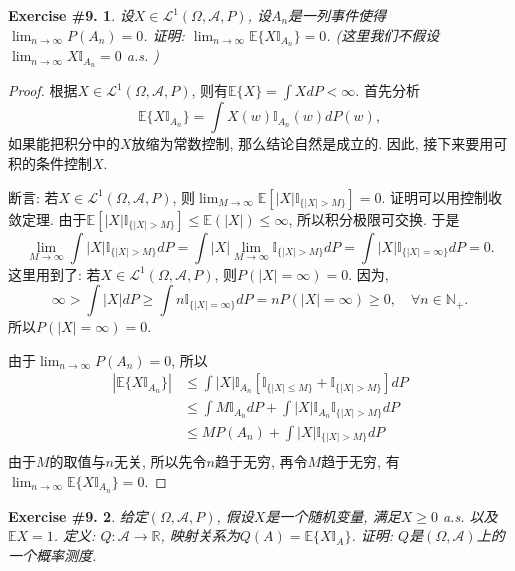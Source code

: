 \documentclass[UTF8, a4paper]{article}
\newtheorem{exercise}{Exercise \#9.}
\begin{document}
\begin{framed}
\begin{exercise}
设\(X \in \mathcal{L}^1(\Omega, \mathcal{A}, P)\), 设\(A_n\)是一列事件使得\(\lim_{n\to \infty}P(A_n) = 0\).
证明: \(\lim_{n\to\infty} \mathbb{E}\{X \mathbb{I}_{A_n}\} = 0\). (这里我们不假设$\lim _{n \rightarrow \infty} X \mathbb{I}_{A_n}=0$ a.s. )
\end{exercise}
\end{framed}
\begin{proof}
根据\(X \in \mathcal{L}^1(\Omega, \mathcal{A}, P)\), 
则有\(\mathbb{E}\{X\} = \int X dP < \infty\).
首先分析
$$
\mathbb{E}\{X \mathbb{I}_{A_n}\} = \int X(w) \mathbb{I}_{A_n}(w) dP(w) ,
$$
如果能把积分中的\(X\)放缩为常数控制, 那么结论自然是成立的.
因此, 接下来要用可积的条件控制\(X\).

断言: 若\(X \in \mathcal{L}^1(\Omega,\mathcal{A}, P)\), 则\(\lim_{M \to\infty}\mathbb{E}\left[|X|\mathbb{I}_{\{|X| > M\}}\right] = 0\).
证明可以用控制收敛定理.
由于\(\mathbb{E}\left[|X|\mathbb{I}_{\{|X| > M\}}\right] \leq \mathbb{E}\left(|X|\right) \leq \infty\), 所以积分极限可交换.
于是 
$$
\lim_{M\to\infty} \int |X| \mathbb{I}_{\{|X| > M\}} dP = \int |X| \lim_{M\to\infty}\mathbb{I}_{\{|X| > M\}} dP = \int |X| \mathbb{I}_{\{|X| = \infty\}} dP = 0.
$$
这里用到了: 若\(X \in \mathcal{L}^1(\Omega, \mathcal{A}, P)\), 则\(P(|X| = \infty) = 0\).
因为,
$$
\infty > \int |X| dP \geq \int n\mathbb{I}_{\{|X| = \infty\}} dP = n P(|X| = \infty) \geq 0, \quad \forall n \in \mathbb{N}_+.
$$
所以\(P(|X| = \infty) = 0\).


由于\(\lim_{n\to\infty}P(A_n) = 0\), 所以
$$
\begin{aligned}
    |\mathbb{E}\{X \mathbb{I}_{A_n}\}| &\leq \int |X| \mathbb{I}_{A_n} \left[\mathbb{I}_{\{|X| \leq M\}} + \mathbb{I}_{\{|X| > M\}}\right] dP \\
    &\leq \int M \mathbb{I}_{A_n} dP + \int |X| \mathbb{I}_{A_n} \mathbb{I}_{\{|X| > M\}} dP \\
    &\leq M P(A_n) + \int |X| \mathbb{I}_{\{|X| > M\}} dP \\
\end{aligned}
$$
由于\(M\)的取值与\(n\)无关, 所以先令\(n\)趋于无穷, 再令\(M\)趋于无穷, 有\(\lim_{n\to\infty} \mathbb{E}\{X \mathbb{I}_{A_n}\} = 0\).

\end{proof}


\begin{framed}
\begin{exercise}
给定\((\Omega, \mathcal{A}, P)\), 假设\(X\)是一个随机变量, 满足\(X \geq 0\)  a.s. 以及\(\mathbb{E}X = 1\).
定义: \(Q:\mathcal{A} \to \mathbb{R}\), 映射关系为\(Q(A) = \mathbb{E}\{X \mathbb{I}_A\}\).
证明: \(Q\)是\((\Omega, \mathcal{A})\)上的一个概率测度.
\end{exercise}
\end{framed}
\end{document}

